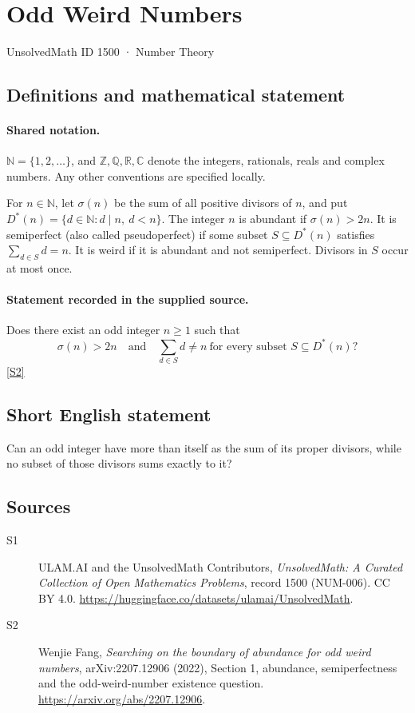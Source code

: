 \documentclass[11pt]{article}
\newcommand{\sref}[2]{\hyperlink{source:#1:#2}{[S#2]}}
\begin{document}
\setcounter{section}{1499}
\section{Odd Weird Numbers}\label{1500}
{\small\sffamily UnsolvedMath ID 1500 · Number Theory}
\subsection{Definitions and mathematical statement}

\paragraph{Shared notation.}$\mathbb N=\{1,2,\ldots\}$, and $\mathbb Z,\mathbb Q,\mathbb R,\mathbb C$ denote the integers, rationals, reals and complex numbers. Any other conventions are specified locally.


For \(n\in\mathbb N\), let \(\sigma(n)\) be the sum of all
positive divisors of \(n\), and put
\(D^*(n)=\{d\in\mathbb N:d\mid n,\ d<n\}\).
The integer \(n\) is abundant if \(\sigma(n)>2n\).
It is semiperfect (also called pseudoperfect) if some subset
\(S\subseteq D^*(n)\) satisfies \(\sum_{d\in S}d=n\).
It is weird if it is abundant and not semiperfect.
Divisors in \(S\) occur at most once.
\paragraph{Statement recorded in the supplied source.}
Does there exist an odd integer \(n\ge1\) such that
\[
 \sigma(n)>2n\quad\text{and}\quad
 \sum_{d\in S}d\ne n\ \text{for every subset }S\subseteq D^*(n)?
\] \sref{1500}{2}
\subsection{Short English statement}
Can an odd integer have more than itself as the sum of its proper divisors, while no subset of those divisors sums exactly to it?
\subsection{Sources}
\begin{description}
\item[\hypertarget{source:1500:1}{S1}] ULAM.AI and the UnsolvedMath Contributors, \emph{UnsolvedMath: A Curated Collection of Open Mathematics Problems}, record 1500 (NUM-006). CC BY 4.0. \url{https://huggingface.co/datasets/ulamai/UnsolvedMath}.
\item[\hypertarget{source:1500:2}{S2}] Wenjie Fang, \emph{Searching on the boundary of abundance for odd weird numbers}, arXiv:2207.12906 (2022), Section 1, abundance, semiperfectness and the odd-weird-number existence question. \url{https://arxiv.org/abs/2207.12906}.
\end{description}
\label{end:1500}
\end{document}
